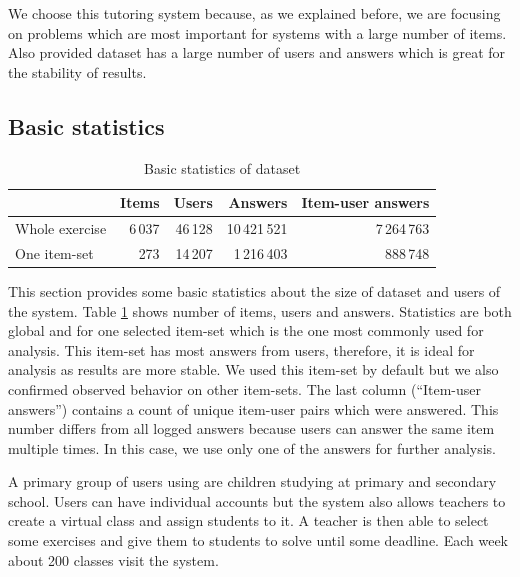 \documentclass[
  digital, %
  table,   %
  nolof,     %
  nolot,     %
  nocover,
  color,
  final, %
]{fithesis3}
\begin{document}

We choose this tutoring system because, as we explained before, we are focusing on problems which are most important for systems with a large number of items. Also provided dataset has a large number of users and answers which is great for the stability of results.


\subsection{Basic statistics}\label{basic-statistics}

\begin{table}
  \begin{tabular}{|l|r r r r|}
    \hline
     & Items & Users & Answers & Item-user answers \\
    \hline\hline
    Whole exercise & 6\,037 & 46\,128 & 10\,421\,521 & 7\,264\,763 \\
    \hline
    One item-set & 273 & 14\,207 & 1\,216\,403 & 888\,748 \\
    \hline
  \end{tabular}
  \caption{Basic statistics of dataset}
  \label{tab:basic-statistics}
\end{table}

This section provides some basic statistics about the size of dataset and users of the system. Table \ref{tab:basic-statistics} shows number of items, users and answers. Statistics are both global and for one selected item-set which is the one most commonly used for analysis. This item-set has most answers from users, therefore, it is ideal for analysis as results are more stable. We used this item-set by default but we also confirmed observed behavior on other item-sets. The last column (``Item-user answers'') contains a count of unique item-user pairs which were answered. This number differs from all logged answers because users can answer the same item multiple times. In this case, we use only one of the answers for further analysis.


A primary group of users using \umimeCesky{} are children studying at primary and secondary school. Users can have individual accounts
but the system also allows teachers to create a virtual class and assign students to it. A teacher is then able to select some exercises and give them to students to solve until some deadline. Each week about 200 classes visit the system.
\end{document}
